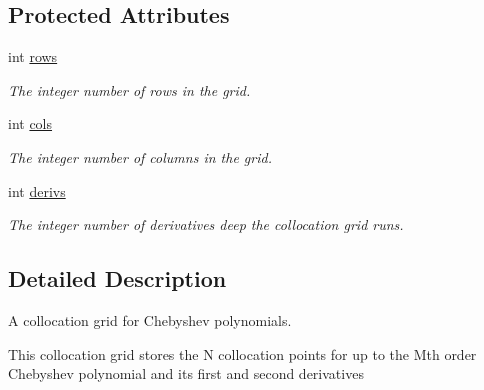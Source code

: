 \subsection*{Protected Attributes}
\begin{DoxyCompactItemize}
\item 
\hypertarget{classcollocation_1_1collocation__grid_ac1091b01caad2cb238586116ac51852d}{int \hyperlink{classcollocation_1_1collocation__grid_ac1091b01caad2cb238586116ac51852d}{rows}}\label{classcollocation_1_1collocation__grid_ac1091b01caad2cb238586116ac51852d}

\begin{DoxyCompactList}\small\item\em The integer number of rows in the grid. \end{DoxyCompactList}\item 
\hypertarget{classcollocation_1_1collocation__grid_ae2fe5a4cc61080740c692bcfa13730fb}{int \hyperlink{classcollocation_1_1collocation__grid_ae2fe5a4cc61080740c692bcfa13730fb}{cols}}\label{classcollocation_1_1collocation__grid_ae2fe5a4cc61080740c692bcfa13730fb}

\begin{DoxyCompactList}\small\item\em The integer number of columns in the grid. \end{DoxyCompactList}\item 
\hypertarget{classcollocation_1_1collocation__grid_a37941e925c4f43a83206b2be70a5d63b}{int \hyperlink{classcollocation_1_1collocation__grid_a37941e925c4f43a83206b2be70a5d63b}{derivs}}\label{classcollocation_1_1collocation__grid_a37941e925c4f43a83206b2be70a5d63b}

\begin{DoxyCompactList}\small\item\em The integer number of derivatives deep the collocation grid runs. \end{DoxyCompactList}\end{DoxyCompactItemize}


\subsection{Detailed Description}
A collocation grid for Chebyshev polynomials. 



 This collocation grid stores the N collocation points for up to the Mth order Chebyshev polynomial and its first and second derivatives 

